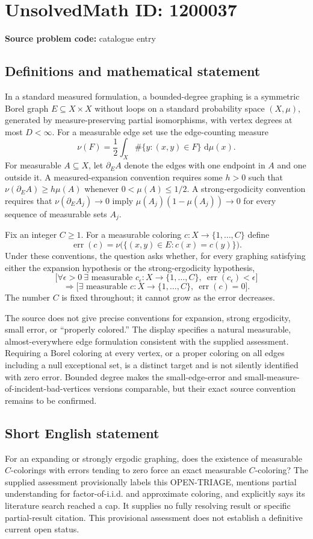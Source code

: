\documentclass[11pt]{article}
\newcommand{\dd}{\,\mathrm{d}}
\begin{document}
\section*{UnsolvedMath ID: 1200037}
\textbf{Source problem code:} catalogue entry
\subsection{Definitions and mathematical statement}
In a standard measured formulation, a bounded-degree graphing is a symmetric Borel graph $E\subseteq X\times X$ without loops on a standard probability space $(X,\mu)$, generated by measure-preserving partial isomorphisms, with vertex degrees at most $D<\infty$. For a measurable edge set use the edge-counting measure
\[
 \nu(F)=\frac12\int_X\#\{y:(x,y)\in F\}\,\dd\mu(x).
\]
For measurable $A\subseteq X$, let $\partial_E A$ denote the edges with one endpoint in $A$ and one outside it. A measured-expansion convention requires some $h>0$ such that $\nu(\partial_E A)\geq h\mu(A)$ whenever $0<\mu(A)\leq1/2$. A strong-ergodicity convention requires that $\nu(\partial_E A_j)\to0$ imply $\mu(A_j)(1-\mu(A_j))\to0$ for every sequence of measurable sets $A_j$.

Fix an integer $C\geq1$. For a measurable coloring $c:X\to\{1,\ldots,C\}$ define
\[
 \operatorname{err}(c)=\nu\bigl(\{(x,y)\in E:c(x)=c(y)\}\bigr).
\]
Under these conventions, the question asks whether, for every graphing satisfying either the expansion hypothesis or the strong-ergodicity hypothesis,
\[
 \bigl[\forall\epsilon>0\ \exists\text{ measurable }c_\epsilon:X\to\{1,\ldots,C\},\
       \operatorname{err}(c_\epsilon)<\epsilon\bigr]
\]
\[
 \Longrightarrow
 \bigl[\exists\text{ measurable }c:X\to\{1,\ldots,C\},\
       \operatorname{err}(c)=0\bigr].
\]
The number $C$ is fixed throughout; it cannot grow as the error decreases.

The source does not give precise conventions for expansion, strong ergodicity, small error, or ``properly colored.'' The display specifies a natural measurable, almost-everywhere edge formulation consistent with the supplied assessment. Requiring a Borel coloring at every vertex, or a proper coloring on all edges including a null exceptional set, is a distinct target and is not silently identified with zero error. Bounded degree makes the small-edge-error and small-measure-of-incident-bad-vertices versions comparable, but their exact source convention remains to be confirmed.
\subsection{Short English statement}
For an expanding or strongly ergodic graphing, does the existence of measurable $C$-colorings with errors tending to zero force an exact measurable $C$-coloring? The supplied assessment provisionally labels this OPEN-TRIAGE, mentions partial understanding for factor-of-i.i.d. and approximate coloring, and explicitly says its literature search reached a cap. It supplies no fully resolving result or specific partial-result citation. This provisional assessment does not establish a definitive current open status.
\end{document}
